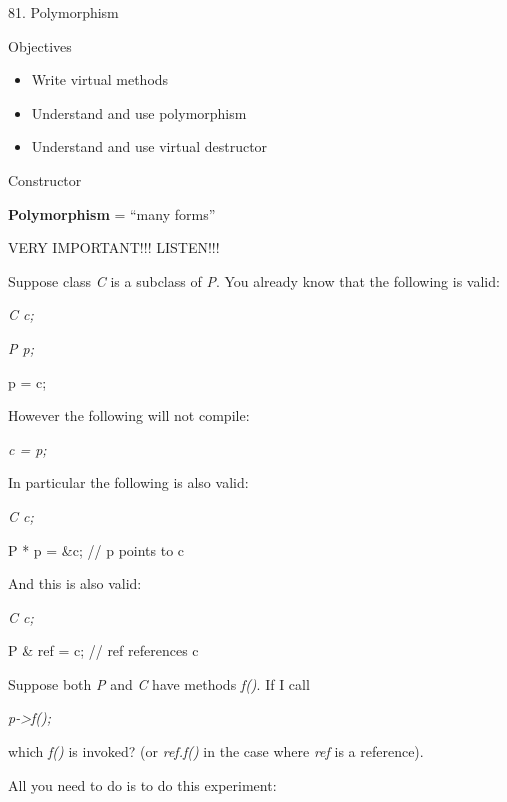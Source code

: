 \documentclass[
]{article}
\author{}
\date{}
\providecommand{\tightlist}{%
  \setlength{\itemsep}{0pt}\setlength{\parskip}{0pt}}
\begin{document}
81. Polymorphism

Objectives

\begin{itemize}
\tightlist
\item
  Write virtual methods
\item
  Understand and use polymorphism
\item
  Understand and use virtual destructor
\end{itemize}

Constructor

\textbf{Polymorphism} = ``many forms''

VERY IMPORTANT!!! LISTEN!!!

Suppose class \emph{C} is a subclass of \emph{P}. You already know that
the following is valid:

\emph{C c; }

\emph{P p;}

p = c;

However the following will not compile:

\emph{c = p;}

In particular the following is also valid:

\emph{C c; }

P * p = \&c; // p points to c

And this is also valid:

\emph{C c; }

P \& ref = c; // ref references c

Suppose both \emph{P} and \emph{C} have methods \emph{f()}. If I call

\emph{p-\textgreater f();}

which \emph{f()} is invoked? (or \emph{ref.f()} in the case where
\emph{ref} is a reference).

All you need to do is to do this experiment:
\end{document}
